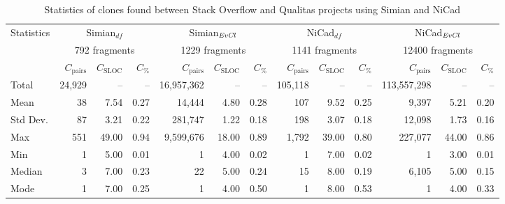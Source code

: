 \documentclass{sig-alternate-05-2015}
\begin{document}
\begin{table}[h]
	\centering
	\caption{Statistics of clones found between Stack Overflow and Qualitas projects using Simian and NiCad}
	\label{t_simian_raw_results}
	\small
		\begin{tabular}{l|r|r|r|r|r|r|r|r|r|r|r|r}
			\hline
			\multirow{3}{*}{Statistics} 
			& \multicolumn{3}{c|}{Simian$_{df}$} 
			& \multicolumn{3}{c|}{Simian$_{\textrm{\textit{EvCl}}}$}
			& \multicolumn{3}{c|}{NiCad$_{df}$} 
			& \multicolumn{3}{c}{NiCad$_{\textrm{\textit{EvCl}}}$} \\ \cline{2-13} 
			& \multicolumn{3}{c|}{792 fragments} 
			& \multicolumn{3}{c|}{1229 fragments}  
			& \multicolumn{3}{c|}{1141 fragments} 
			& \multicolumn{3}{c}{12400 fragments} \\ \cline{2-13}
			& $C_{\mathrm{pairs}}$ & $C_{\mathrm{SLOC}}$ & $C_{\mathrm{\%}}$ 
			& $C_{\mathrm{pairs}}$ & $C_{\mathrm{SLOC}}$ & $C_{\mathrm{\%}}$ 
			& $C_{\mathrm{pairs}}$ & $C_{\mathrm{SLOC}}$ & $C_{\mathrm{\%}}$
			& $C_{\mathrm{pairs}}$ & $C_{\mathrm{SLOC}}$ & $C_{\mathrm{\%}}$ \\ 
			\hline
			Total & 24,929 & -- & -- & 16,957,362 & --	& -- & 105,118 	& -- & -- & 113,557,298 & -- & -- \\
			Mean & 38 & 7.54 & 0.27 & 14,444 & 4.80 & 0.28 & 107 & 9.52 & 0.25 & 9,397 & 5.21 & 0.20 \\
			Std Dev. & 87 & 3.21 & 0.22 & 281,747 & 1.22 & 0.18 & 198 & 3.07 & 0.18 & 12,098 & 1.73 & 0.16 \\
			Max  & 551 & 49.00 & 0.94 & 9,599,676 & 18.00 & 0.89 & 1,792 & 39.00 & 0.80 & 227,077 & 44.00 & 0.86 \\
			Min  & 1 & 5.00 & 0.01 & 1 & 4.00 & 0.02 & 1 & 7.00 & 0.02 & 1 & 3.00 & 0.01 \\
			Median  & 3 & 7.00 & 0.23 & 22 & 5.00 & 0.24 & 15 & 8.00 & 0.19 & 6,105 & 5.00 	& 0.15 \\
			Mode  & 1 & 7.00 & 0.25 & 1 & 4.00 & 0.50 & 1 & 8.00 & 0.53 & 1 & 4.00 & 0.33 \\
			\hline
		\end{tabular} %
\end{table}
\end{document}
